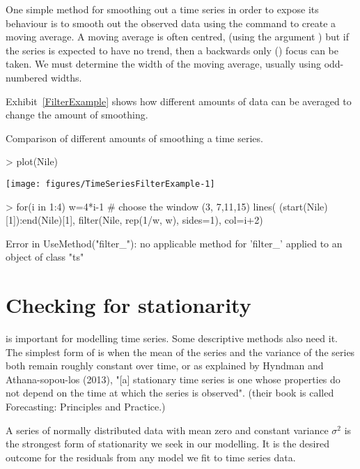 One simple method for smoothing out a time series in order to expose its behaviour is to smooth out the observed data using  the  command to create a moving average.
A moving average is often centred, (using the argument ) but if the series is expected to have no trend, then a backwards only ()  focus can be taken. We must determine the width of the moving average, usually using odd-numbered widths.

Exhibit~\ref{FilterExample} shows how different amounts of data can be averaged to change the amount of smoothing.
\begin{exhibit}
\begin{center}
\caption{Comparison of different amounts of smoothing a time series.}
\label{FilterExample}
\begin{Schunk}
\begin{Sinput}
> plot(Nile)
\end{Sinput}

\texttt{[image: figures/TimeSeriesFilterExample-1]} \begin{Sinput}
> for(i in 1:4){
   w=4*i-1 # choose the window (3, 7,11,15)
   lines( (start(Nile)[1]):end(Nile)[1], filter(Nile, rep(1/w, w), sides=1), col=i+2)
   }
\end{Sinput}
\begin{Soutput}
Error in UseMethod("filter_"): no applicable method for 'filter_' applied to an object of class "ts"
\end{Soutput}
\end{Schunk}
\end{center}
\end{exhibit}

\section{Checking for stationarity}\label{Stationarity} 

 is important for modelling time series. Some descriptive methods also need it.
The simplest form of  is when the mean of the series and the variance of the series both remain roughly constant over time, or as explained by Hyndman and Athana-sopou-los (2013), "[a] stationary time series is one whose properties do not depend on the time at which the series is observed". (their book is called Forecasting: Principles and Practice.)
 
A  series of normally distributed data with mean zero and constant variance $\sigma^2$ is the strongest form of stationarity we seek in our modelling. It is the desired outcome for the residuals from any model we fit to time series data.


